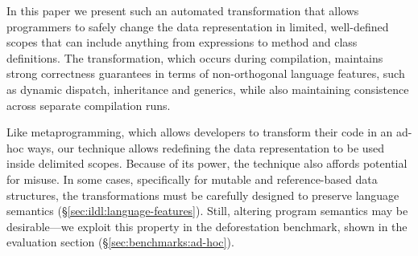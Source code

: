 In this paper we present such an automated transformation that allows programmers to safely change the data representation in limited, well-defined scopes that can include anything from expressions to method and class definitions. The transformation, which occurs during compilation, maintains strong correctness guarantees in terms of non-orthogonal language features, such as dynamic dispatch, inheritance and generics, while also maintaining consistence across separate compilation runs.

Like metaprogramming, which allows developers to transform their code
in an ad-hoc ways, our technique allows redefining the data
representation to be used inside delimited scopes. 
%
Because of its power, the technique also affords potential
for misuse. In some cases, specifically for mutable and
reference-based data structures, the transformations
must be carefully designed to preserve language semantics
(\S\ref{sec:ildl:language-features}). Still, altering program
semantics may be desirable---we exploit this property in the
deforestation benchmark, shown in the evaluation section (\S\ref{sec:benchmarks:ad-hoc}).

